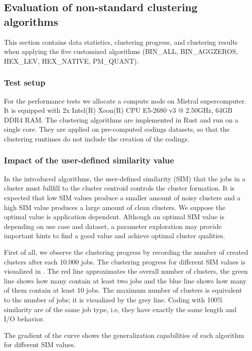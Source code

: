 \documentclass[]{llncs}
\begin{document}
\subsection{Evaluation of non-standard clustering algorithms}
This section contains data statistics, clustering progress, and clustering results when applying the five customized algorithms (BIN\_ALL, BIN\_AGGZEROS, HEX\_LEV, HEX\_NATIVE, PM\_QUANT).

\subsubsection{Test setup}
For the performance tests we allocate a compute node on Mistral supercomputer.
It is equipped with 2x Intel(R) Xeon(R) CPU E5-2680 v3 @ 2.50GHz, 64GB DDR4 RAM.
The clustering algorithms are implemented in Rust and run on a single core.
They are applied on pre-computed codings datasets, so that the clustering runtimes do not include the creation of the codings.

\subsubsection{Impact of the user-defined similarity value}
In the introduced algorithms, the user-defined similarity (SIM) that the jobs in a cluster must fullfill to the cluster centroid controls the cluster formation.
It is expected that low SIM values produce a smaller amount of noisy clusters and a high SIM value produces a large amount of clean clusters.
We suppose the optimal value is application dependent.
Although an optimal SIM value is depending on use case and dataset, a parameter exploration may provide important hints to find a good value and achieve optimal cluster qualities.

First of all, we observe the clustering progress by recording the number of created clusters after each 10.000 jobs.
The clustering progress for different SIM values is visualized in .
The red line approximates the overall number of clusters, the green line shows how many contain at least two jobs and the blue line shows how many of them contain at least 10 jobs.
The maximum number of clusters is equivalent to the number of jobs; it is visualized by the grey line.
Coding with 100$\%$  similarity are of the same job type, i.e, they have exactly the same length and I/O behavior.

The gradient of the curve shows the generalization capabilities of each algorithm for different SIM values.
\end{document}
